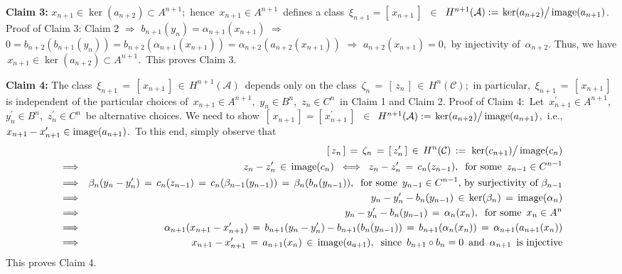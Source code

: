 \vskip 0.5cm
\noindent
\textbf{Claim 3:}\;\;
$x_{n+1} \in  \ker(a_{n+2}) \subset A^{n+1}$;\,
hence \,$x_{n+1} \in A^{n+1}$\, defines a class
\,$\xi_{n+1} = \left[\,x_{n+1}\,\right]$\,
$\in$
\,$H^{n+1}(\mathcal{A}) := \left.\ker(\overset{{\color{white}.}}{a_{n+2}})\right/\image(a_{n+1})$.\,
\vskip 0.2cm
\noindent
Proof of Claim 3:
Claim 2
\;$\Longrightarrow$\;
$b_{n+1}(y_{n}) = \alpha_{n+1}(x_{n+1})$
\;$\Longrightarrow$\;
$0 = b_{n+2}(b_{n+1}(y_{n})) = b_{n+2}(\alpha_{n+1}(x_{n+1})) = \alpha_{n+2}(a_{n+2}(x_{n+1}))$
\;$\Longrightarrow$\;
$a_{n+2}(x_{n+1}) = 0$,\, by injectivity of \,$\alpha_{n+2}$.
Thus, we have \,$x_{n+1} \in  \ker(a_{n+2}) \subset A^{n+1}$.\,
This proves Claim 3. 

\vskip 0.5cm
\noindent
\textbf{Claim 4:}\;\;
The class
\,$\xi_{n+1} \,=\, \left[\,x_{n+1}\,\right] \,\in\, H^{n+1}(\mathcal{A})$\,
depends only on the class
\,$\zeta_{n} \,=\, \left[\,z_{n}\,\right] \,\in\, H^{n}(\mathcal{C})$;\,
in particular,
\,$\xi_{n+1} \,=\, \left[\,x_{n+1}\,\right]$\,
is independent of the particular choices of
\,$x_{n+1} \in A^{n+1}$,\, $y_{n} \in B^{n}$,\, $z_{n} \in C^{n}$\,
in Claim 1 and Claim 2.
\vskip 0.2cm
\noindent
Proof of Claim 4:\,
Let
\,$x_{n+1}^{\prime} \in A^{n+1}$,
\,$y_{n}^{\prime} \in B^{n}$,
\,$z_{n}^{\prime} \in C^{n}$\,
be alternative choices.
We need to show
\,$\left[\,x_{n+1}\,\right] = \left[\,x_{n+1}^{\prime}\,\right]$\,
$\in$
\,$H^{n+1}(\mathcal{A}) := \left.\ker(\overset{{\color{white}.}}{a_{n+2}})\right/\image(a_{n+1})$,\,
i.e.,
\,$x_{n+1} - x_{n+1}^{\prime} \in \textnormal{image}(a_{n+1})$.\,
To this end, simply observe that
\begin{eqnarray*}
&&
	\left[\,z_{n}\,\right] \,=\, \zeta_{n} \,=\, \left[\,z_{n}^{\prime}\,\right]
	\,\in\,
		H^{n}(\mathcal{C}) \,:=\, \left.\ker(\overset{{\color{white}.}}{c_{n+1}})\right/\image(c_{n})
\\
& \Longrightarrow &
	z_{n} - z_{n}^{\prime} \,\in\, \image(c_{n})
\;\; \Longleftrightarrow \;\;
	z_{n} - z_{n}^{\prime} \,=\, c_{n}(z_{n-1}),
	\;\;
	\textnormal{for some \,$z_{n-1} \in C^{n-1}$}
\\
& \Longrightarrow &
	\beta_{n}(y_{n} - y_{n}^{\prime}) \,=\, c_{n}(z_{n-1}) \,=\, c_{n}(\beta_{n-1}(y_{n-1})) \,=\, \beta_{n}(b_{n}(y_{n-1})),
	\;\;
	\textnormal{for some \,$y_{n-1} \in C^{n-1}$, by surjectivity of $\beta_{n-1}$}
\\
& \Longrightarrow &
	y_{n} - y_{n}^{\prime} - b_{n}(y_{n-1}) \,\in\, \ker(\beta_{n}) \,=\, \image(\alpha_{n})
\\
& \Longrightarrow &
	y_{n} - y_{n}^{\prime} - b_{n}(y_{n-1}) \,=\, \alpha_{n}(x_{n}),
	\;\;
	\textnormal{for some \,$x_{n} \in A^{n}$}
\\
& \Longrightarrow &
	\alpha_{n+1}(x_{n+1} - x_{n+1}^{\prime})
	\,=\,
		b_{n+1}(y_{n} - y_{n}^{\prime}) - b_{n+1}(b_{n}(y_{n-1}))
	\,=\,
		b_{n+1}(\alpha_{n}(x_{n}))
	\,=\,
		\alpha_{n+1}(a_{n+1}(x_{n}))
\\
& \Longrightarrow &
	x_{n+1} - x_{n+1}^{\prime} \,=\, a_{n+1}(x_{n}) \,\in\, \image(a_{a+1}),
	\;\;
	\textnormal{since \,$b_{n+1} \circ b_{n} = 0$\, and \,$\alpha_{n+1}$\, is injective}
\end{eqnarray*}
This proves Claim 4.

